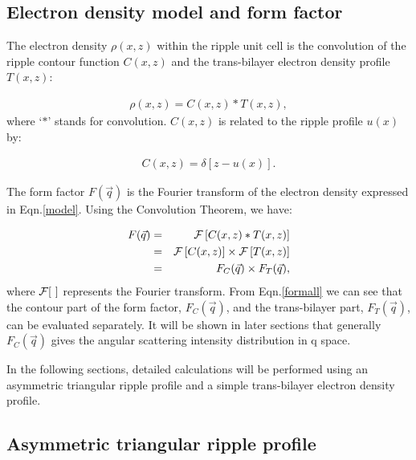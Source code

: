 \subsection{Electron density model and form factor}

The electron density $\rho (x,z)$ within the ripple unit cell is the 
convolution of the ripple contour function $C(x,z)$ and the trans-bilayer 
electron density profile $T(x,z)$:

\begin{eqnarray}
\label{model}
\rho (x,z) = C(x,z) \ast T(x,z),
\end{eqnarray}
where `$\ast$' stands for convolution. $C(x,z)$ is related to the ripple profile
$u(x)$ by:

\begin{eqnarray}
\label{contour}
C(x,z) = \delta [z - u(x)].
\end{eqnarray}

The form factor $F(\vec{q})$ is the Fourier transform of the electron density
expressed in Eqn.\ref{model}. Using the Convolution Theorem, we have:

\begin{eqnarray}
\label{formall}
F(\vec{q}) =&& {\cal F} \left[ C(x,z) * T(x,z) \right]\nonumber\\
=&& {\cal F} \left[ C(x,z) \right] \times {\cal F} \left[ T(x,z) \right]\nonumber\\
=&& F_C(\vec{q}) \times F_T(\vec{q}),
\end{eqnarray}
where ${\cal F} [\ ]$ represents the Fourier transform. From Eqn.\ref{formall}
we can see that the contour part of the form factor, $F_C(\vec{q})$, and the 
trans-bilayer part, $F_T(\vec{q})$, can be evaluated separately. It will be 
shown in later sections that generally $F_C(\vec{q})$ gives the angular 
scattering intensity distribution in q space.

In the following sections, detailed calculations will be performed using an
asymmetric triangular ripple profile and a simple trans-bilayer electron 
density profile.

\subsection{Asymmetric triangular ripple profile}

